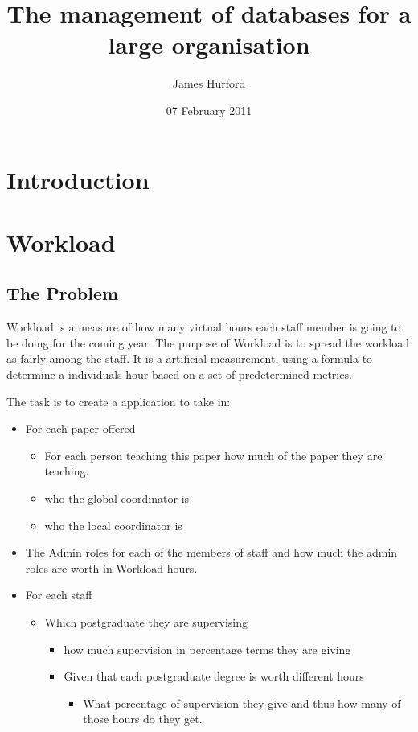 \documentclass[11pt]{article}
\title{The management of databases for a large organisation}
\author{James Hurford}
\date{07 February 2011}
\begin{document}
\maketitle

\setcounter{tocdepth}{3}
\tableofcontents
\vspace*{1cm}

\section{Introduction}
\label{sec-1}
\section{Workload}
\label{sec-2}
\subsection{The Problem}
\label{sec-2_1}

Workload is a measure of how many virtual hours each staff member is
going to be doing for the coming year. The purpose of Workload is to
spread the workload as fairly among the staff.  It is a artificial
measurement, using a formula to determine a individuals hour based on
a set of predetermined metrics.

The task is to create a application to take in:

\begin{itemize}
\item For each paper offered

\begin{itemize}
\item For each person teaching this paper how much of the paper they
    are teaching.
\item who the global coordinator is
\item who the local coordinator is
\end{itemize}

\item The Admin roles for each of the members of staff and how much
  the admin roles are worth in Workload hours.
\item For each staff

\begin{itemize}
\item Which postgraduate they are supervising

\begin{itemize}
\item how much supervision in percentage terms they are giving
\item Given that each postgraduate degree is worth different hours

\begin{itemize}
\item What percentage of supervision they give and thus how many of
        those hours do they get.
\end{itemize}

\end{itemize}

\end{itemize}

\end{itemize}
\end{document}
